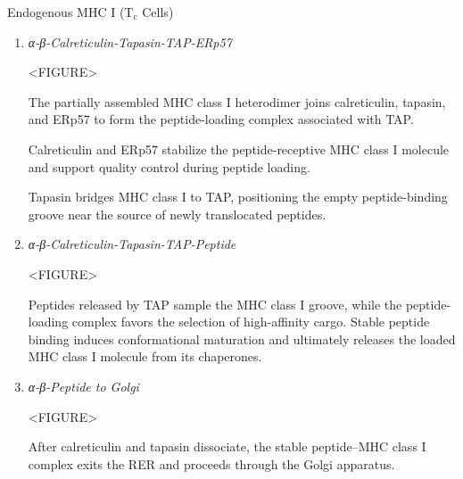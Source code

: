 \begin{core}[label=core:endogenous_mhci]{Endogenous MHC I (T$_{\text{c}}$ Cells)}
\begin{enumerate}[label=(\arabic*)]
\begin{enumerate}
              The membrane-bound chaperone calnexin associates with the α chain and promotes its proper folding.

              Binding of β2-microglobulin stabilizes the α chain and permits calnexin to dissociate.

            \item \textit{α-β-Calreticulin-Tapasin-TAP-ERp57}

              <FIGURE>

              The partially assembled MHC class I heterodimer joins calreticulin, tapasin, and ERp57 to form the peptide-loading complex associated with TAP.

              Calreticulin and ERp57 stabilize the peptide-receptive MHC class I molecule and support quality control during peptide loading.

              Tapasin bridges MHC class I to TAP, positioning the empty peptide-binding groove near the source of newly translocated peptides.

            \item \textit{α-β-Calreticulin-Tapasin-TAP-Peptide}

              <FIGURE>

              Peptides released by TAP sample the MHC class I groove, while the peptide-loading complex favors the selection of high-affinity cargo. Stable peptide binding induces conformational maturation and ultimately releases the loaded MHC class I molecule from its chaperones.

            \item \textit{α-β-Peptide to Golgi}

              <FIGURE>

              After calreticulin and tapasin dissociate, the stable peptide--MHC class I complex exits the RER and proceeds through the Golgi apparatus.


\end{enumerate}
\end{enumerate}
\end{core}
